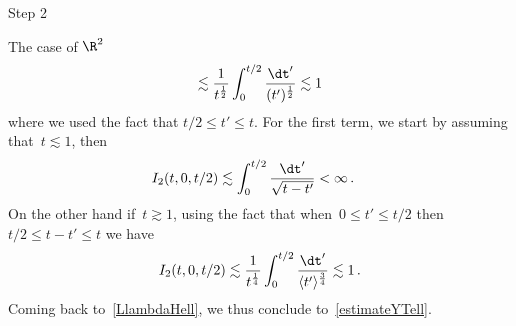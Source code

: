 \begin{step}{Step 2}
\begin{step}{The case of $\R^2$}
\[\begin{aligned}
\lesssim \frac{1}{t^{\frac12}} \int_{0}^{t/2} \frac {\dt'}{(t')^{\frac12}} \lesssim 1 \\
\end{aligned}
\]
where we used the fact that $t/2 \le t' \le t$. For the first term, we start by assuming that~$t\lesssim 1$, then
\[
\begin{aligned}
I_2(t,0,t/2) &\lesssim \int_0^{t/2} \frac{\dt'}{\sqrt{t-t'}} < \infty\,.
\end{aligned}
\]
On the other hand if~$t\gtrsim 1$, using the fact that when~$0\leq t'\leq t/2$ then~$t/2\leq t-t'\leq t$ we have
\[
I_2(t,0,t/2) \lesssim \frac{1}{t^{\frac14}} \int_0^{t/2} \frac{\dt'}{\langle t'\rangle^\frac34} \lesssim 1 \,.
\]
Coming back to~\eqref{LlambdaHell}, we thus conclude to~\eqref{estimateYTell}.
\end{step}
\end{step}


